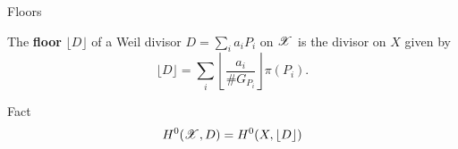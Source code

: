 \begin{frame}{Floors}

 \begin{definition} \label{def:floor}
The \textbf{floor} $\lfloor D \rfloor$ of a Weil divisor $D = \sum_i a_i P_i$ on ${\mathscr X}$ is the divisor on $X$ given by 
 \[
\lfloor D \rfloor = \sum_i  \left\lfloor \frac{a_i}{\# G_{P_i}} \right\rfloor \pi(P_i).
 \]
\end{definition}

\begin{block}{Fact}
  \[
H^0({\mathscr X},D) = H^0(X,\lfloor D \rfloor)
\]
\end{block}




\end{frame}
